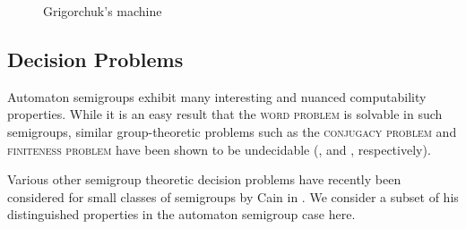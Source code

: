 \documentclass[10pt]{article} %
\newcommand{\decprob}[1]{\textsc{#1}}
\begin{document}
    \begin{figure}
    \begin{center}
    \caption{Grigorchuk's machine}
    \end{center}
    \end{figure}

    \subsection*{Decision Problems}
    Automaton semigroups exhibit many interesting and nuanced computability properties. While it is an easy result that the \decprob{word problem} is solvable in such semigroups, similar group-theoretic problems such as the \decprob{conjugacy problem} and \decprob{finiteness problem} have been shown to be undecidable (\cite{sunic:conj}, and \cite{gillibert:finite}, respectively).

    Various other semigroup theoretic decision problems have recently been considered for small classes of semigroups by Cain in \cite{Cain09:dec_prob}. We consider a subset of his distinguished properties in the automaton semigroup case here.

\end{document}
